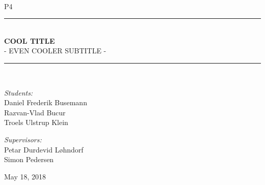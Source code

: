 \newcommand{\HRule}{\rule{\linewidth}{0.5 mm}}
\begin{titlepage}

\begin{center}
\\[0.5cm]

\textsc{\Large P4}\\[0.6cm]

\HRule \\[0.8cm]
{ \Huge \bfseries  COOL TITLE}\\[0.4cm]

  \Large{ - EVEN COOLER SUBTITLE -
  }

\HRule \\[1.2cm]

\begin{minipage}{0.49\textwidth}
\begin{flushleft} \large
\emph{Students:}\\
Daniel Frederik Busemann\\
Razvan-Vlad Bucur\\
Troels Ulstrup Klein\\
\end{flushleft}
\end{minipage}
\begin{minipage}{0.49\textwidth}
\begin{flushright} \large
\emph{Supervisors:} \\
Petar Durdevid Løhndorf\\
Simon Pedersen
\end{flushright}
\end{minipage}

\vfill

{\large May 18, 2018}



\end{center}

\end{titlepage}
